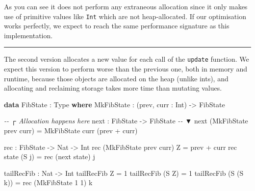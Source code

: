 \documentclass[
]{article}
\newenvironment{Shaded}{}{}
\newcommand{\CommentTok}[1]{\textcolor[rgb]{0.38,0.63,0.69}{\textit{#1}}}
\newcommand{\DataTypeTok}[1]{\textcolor[rgb]{0.56,0.13,0.00}{#1}}
\newcommand{\DecValTok}[1]{\textcolor[rgb]{0.25,0.63,0.44}{#1}}
\newcommand{\KeywordTok}[1]{\textcolor[rgb]{0.00,0.44,0.13}{\textbf{#1}}}
\newcommand{\NormalTok}[1]{#1}
\newcommand{\OperatorTok}[1]{\textcolor[rgb]{0.40,0.40,0.40}{#1}}
\newcommand{\OtherTok}[1]{\textcolor[rgb]{0.00,0.44,0.13}{#1}}
\begin{document}
As you can see it does not perform any extraneous allocation since it
only makes use of primitive values like \texttt{Int} which are not
heap-allocated. If our optimisation works perfectly, we expect to reach
the same performance signature as this implementation.

\begin{center}\rule{0.5\linewidth}{0.5pt}\end{center}

The second version allocates a new value for each call of the
\texttt{update} function. We expect this version to perform worse than
the previous one, both in memory and runtime, because those objects are
allocated on the heap (unlike ints), and allocating and reclaiming
storage takes more time than mutating values.

\begin{Shaded}
\begin{Highlighting}[]
\KeywordTok{data} \DataTypeTok{FibState} \OperatorTok{:} \DataTypeTok{Type} \KeywordTok{where}
  \DataTypeTok{MkFibState} \OperatorTok{:}\NormalTok{ (prev, curr }\OperatorTok{:}  \DataTypeTok{Int}\NormalTok{) }\OtherTok{{-}\textgreater{}} \DataTypeTok{FibState}

                            \CommentTok{{-}{-}   ┌ Allocation happens here}
\NormalTok{next }\OperatorTok{:} \DataTypeTok{FibState} \OtherTok{{-}\textgreater{}} \DataTypeTok{FibState} \CommentTok{{-}{-}   ▼}
\NormalTok{next (}\DataTypeTok{MkFibState}\NormalTok{ prev curr) }\OtherTok{=} \DataTypeTok{MkFibState}\NormalTok{ curr (prev }\OperatorTok{+}\NormalTok{ curr)}

\NormalTok{rec }\OperatorTok{:} \DataTypeTok{FibState} \OtherTok{{-}\textgreater{}} \DataTypeTok{Nat} \OtherTok{{-}\textgreater{}} \DataTypeTok{Int}
\NormalTok{rec (}\DataTypeTok{MkFibState}\NormalTok{ prev curr) }\DataTypeTok{Z} \OtherTok{=}\NormalTok{ prev }\OperatorTok{+}\NormalTok{ curr}
\NormalTok{rec state (}\DataTypeTok{S}\NormalTok{ j) }\OtherTok{=}\NormalTok{ rec (next state) j}

\NormalTok{tailRecFib }\OperatorTok{:} \DataTypeTok{Nat} \OtherTok{{-}\textgreater{}} \DataTypeTok{Int}
\NormalTok{tailRecFib }\DataTypeTok{Z} \OtherTok{=} \DecValTok{1}
\NormalTok{tailRecFib (}\DataTypeTok{S} \DataTypeTok{Z}\NormalTok{) }\OtherTok{=} \DecValTok{1}
\NormalTok{tailRecFib (}\DataTypeTok{S}\NormalTok{ (}\DataTypeTok{S}\NormalTok{ k)) }\OtherTok{=}\NormalTok{ rec (}\DataTypeTok{MkFibState} \DecValTok{1} \DecValTok{1}\NormalTok{) k}
\end{Highlighting}
\end{Shaded}
\end{document}
